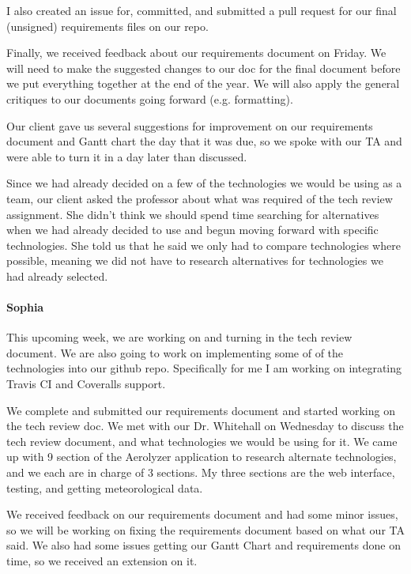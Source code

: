 \documentclass[onecolumn, draftclsnofoot,10pt, compsoc]{IEEEtran}
\begin{document}
\begin{flushleft}
I also created an issue for, committed, and submitted a pull request for our final (unsigned) requirements files on our repo.
 
Finally, we received feedback about our requirements document on Friday. We will need to make the suggested changes to our doc for the final document before we put everything together at the end of the year. We will also apply the general critiques to our documents going forward (e.g. formatting).
 
 
Our client gave us several suggestions for improvement on our requirements document and Gantt chart the day that it was due, so we spoke with our TA and were able to turn it in a day later than discussed.
 
Since we had already decided on a few of the technologies we would be using as a team, our client asked the professor about what was required of the tech review assignment. She didn't think we should spend time searching for alternatives when we had already decided to use and begun moving forward with specific technologies. She told us that he said we only had to compare technologies where possible, meaning we did not have to research alternatives for technologies we had already selected.
 
\paragraph{Sophia}
 
This upcoming week, we are working on and turning in the tech review document. We are also going to work on implementing some of of the technologies into our github repo. Specifically for me I am working on integrating Travis CI and Coveralls support.
 
 
We complete and submitted our requirements document and started working on the tech review doc. We met with our Dr. Whitehall on Wednesday to discuss the tech review document, and what technologies we would be using for it. We came up with 9 section of the Aerolyzer application to research alternate technologies, and we each are in charge of 3 sections. My three sections are the web interface, testing, and getting meteorological data.
 
 
We received feedback on our requirements document and had some minor issues, so we will be working on fixing the requirements document based on what our TA said. We also had some issues getting our Gantt Chart and requirements done on time, so we received an extension on it.
 

\end{flushleft}
\end{document}
